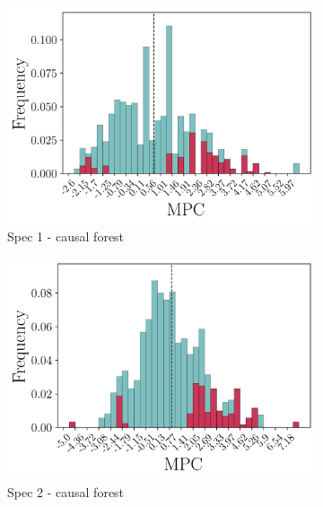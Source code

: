 \begin{figure}[t]
    \begin{subfigure}{0.33\linewidth}
        \includegraphics[width=\linewidth]{figures/distributions/spec1_cf_chTOTexp.png}
        \caption{Spec 1 - causal forest}
    \end{subfigure}\hfill
    \begin{subfigure}{0.33\linewidth}
        \includegraphics[width=\linewidth]{figures/distributions/spec2_cf_chTOTexp.png}
        \caption{Spec 2 - causal forest}
    \end{subfigure}\hfill
    \begin{subfigure}{0.33\linewidth}

\end{subfigure}
\end{figure}
